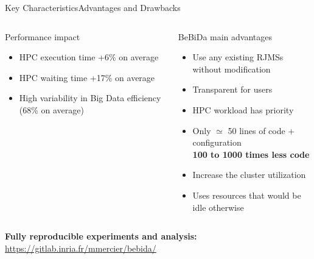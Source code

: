 \documentclass[10pt, compress, titleprogressbar, aspectratio=169]{beamer}
\begin{document}
        \begin{frame}{Key Characteristics}{Advantages and Drawbacks}
            \begin{columns}
                \begin{column}{0.4\textwidth}
                    \begin{alertblock}{Performance impact}
                        \begin{itemize}
                            \item HPC execution time +6\% on average
                            \item HPC waiting time +17\% on average
                            \item High variability in Big Data efficiency (68\% on average)
                        \end{itemize}
                    \end{alertblock}

                \end{column}
                \begin{column}{0.55\textwidth}
                    \begin{exampleblock}{BeBiDa main advantages}
                        \begin{itemize}
                            \item Use any existing RJMSs without modification
                            \item Transparent for users
                            \item HPC workload has priority
                            \item Only $\simeq$ 50 lines of code + configuration\\
                                \vspace{0.5em}
                                \textbf{100 to 1000 times less code}
                            \item Increase the cluster utilization
                            \item Uses resources that would be idle otherwise
                        \end{itemize}
                    \end{exampleblock}
                \end{column}
            \end{columns}
            \vspace{1em}
            \large\textbf{Fully reproducible experiments and analysis:}\\
            \url{https://gitlab.inria.fr/mmercier/bebida/}
        \end{frame}
\end{document}
